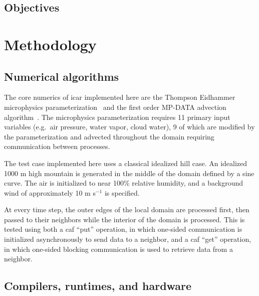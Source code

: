 \subsection{Objectives}

\section{Methodology}
\subsection{Numerical algorithms}
The core numerics of \gls{icar} implemented here are the Thompson Eidhammer microphysics parameterization~\cite{Thompson:2014cw} and the first order MP-DATA advection algorithm~\cite{Smolarkiewicz:1998il}.
The microphysics parameterization requires 11 primary input variables (e.g.\ air pressure, water vapor, cloud water), 9 of which are modified by the parameterization and advected throughout the domain requiring communication between processes.

The test case implemented here uses a classical idealized hill case.
An idealized 1000 m high mountain is generated in the middle of the domain defined by a sine curve.
The air is initialized to near 100\% relative humidity, and a background wind of approximately 10 m s$^{-1}$ is specified.

At every time step, the outer edges of the local domain are processed first,
then passed to their neighbors while the interior of the domain is processed.
This is tested using both a \gls{caf} ``put'' operation, in which one-sided communication is initialized asynchronously to send data to a neighbor,
and a \gls{caf} ``get'' operation, in which one-sided blocking communication is used to retrieve data from a neighbor.

\subsection{Compilers, runtimes, and hardware}

